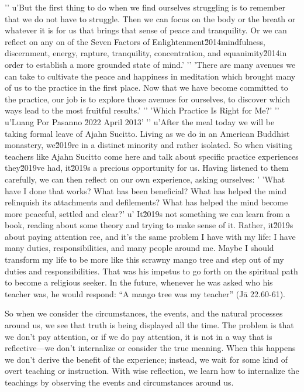 {'\n'
u'But the first thing to do when we find ourselves struggling is to remember that we do not have to struggle. Then we can focus on the body or the breath or whatever it is for us that brings that sense of peace and tranquility. Or we can reflect on any on of the Seven Factors of Enlightenment\u2014mindfulness, discernment, energy, rapture, tranquility, concentration, and equanimity\u2014in order to establish a more grounded state of mind.'
'\n'
'There are many avenues we can take to cultivate the peace and happiness in meditation which brought many of us to the practice in the first place. Now that we have become committed to the practice, our job is to explore those avenues for ourselves, to discover which ways lead to the most fruitful results.'
'\n'
'Which Practice Is Right for Me?'
'\n'
u'Luang Por Pasanno \u2022 April 2013'
'\n'
u'After the meal today we will be taking formal leave of Ajahn Sucitto. Living as we do in an American Buddhist monastery, we\u2019re in a distinct minority and rather isolated. So when visiting teachers like Ajahn Sucitto come here and talk about specific practice experiences they\u2019ve had, it\u2019s a precious opportunity for us. Having listened to them carefully, we can then reflect on our own experience, asking ourselves: '
'What have I done that works? What has been beneficial? What has helped the mind relinquish its attachments and defilements? What has helped the mind become more peaceful, settled and clear?'
u' It\u2019s not something we can learn from a book, reading about some theory and trying to make sense of it. Rather, it\u2019s about paying attention ree, and it's the same problem I have with 
my life: I have many duties, responsibilities, and many people around 
me. Maybe I should transform my life to be more like this scrawny mango 
tree and step out of my duties and responsibilities.} That was his 
impetus to go forth on the spiritual path to become a religious seeker. 
In the future, whenever he was asked who his teacher was, he would 
respond: ``A mango tree was my teacher'' (Jā 22.60-61).

So when we consider the circumstances, the events, and the natural 
processes around us, we see that truth is being displayed all the time. 
The problem is that we don't pay attention, or if we do pay attention, 
it is not in a way that is reflective---we don't internalize or 
consider the true meaning. When this happens we don't derive the 
benefit of the experience; instead, we wait for some kind of overt 
teaching or instruction. With wise reflection, we learn how to 
internalize the teachings by observing the events and circumstances 
around us.

